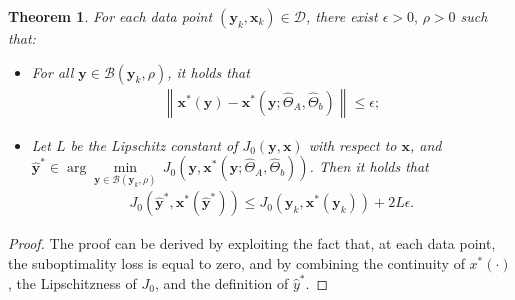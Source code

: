 \documentclass[10pt,a4paper]{amsart}
\newtheorem{theorem}{Theorem}
\newcommand\xbf{\mathbf{x}}
\newcommand\ybf{\mathbf{y}}
\begin{document}
\begin{theorem}\label{Surrogate}
    For each data point $(\ybf_k,\xbf_k) \in \mathcal{D}$, there exist $\epsilon>0, \, \rho >0$ such that:
    \begin{itemize}
        \item For all $\ybf \in \mathcal{B}(\ybf_k, \rho)$, it holds that \begin{align}
        \left\|\xbf^*(\ybf)-\xbf^*(\ybf; \hat{\Theta}_A, \hat{\Theta}_b)\right\|\le \epsilon;
        \end{align}
        \item Let $L$ be the Lipschitz constant of $J_0(\ybf,\xbf)$ with respect to $\xbf$, and $\hat{\ybf}^* \in \arg \min\limits_{\ybf \in \mathcal{B}(\ybf_k, \rho)}\, J_0(\ybf, \xbf^*(\ybf; \hat{\Theta}_A, \hat{\Theta}_b))$. Then it holds that 
        \begin{align}\label{jump}
        J_0(\hat{\ybf}^*, \xbf^*(\hat{\ybf}^*))\le J_0(\ybf_k, \xbf^*(\ybf_k))+ 2 L \epsilon.
        \end{align}
    \end{itemize}
\end{theorem}

\begin{proof}
    The proof can be derived by exploiting the fact that, at each data point, the suboptimality loss is equal to zero, and by combining the continuity of $x^*(\cdot)$, the Lipschitzness of $J_0$, and the definition of $\hat{y}^*$.
\end{proof}
\end{document}
